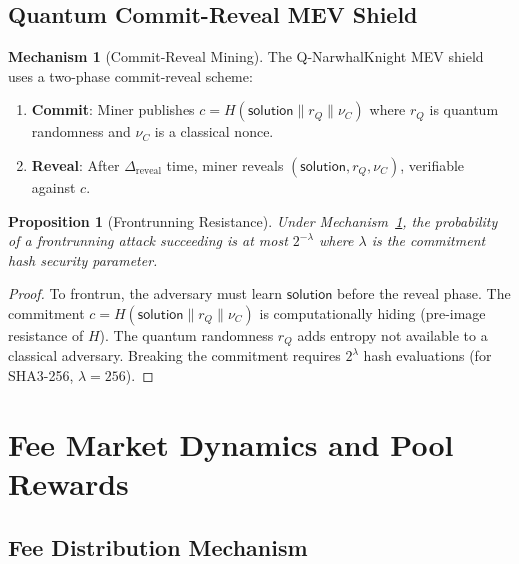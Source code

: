 \documentclass[11pt,a4paper]{article}
\newtheorem{proposition}[theorem]{Proposition}
\theoremstyle{definition}
\newtheorem{mechanism}[theorem]{Mechanism}
\theoremstyle{remark}
\newcommand{\QNK}{\textsf{Q-NarwhalKnight}}
\begin{document}
\subsection{Quantum Commit-Reveal MEV Shield}

\begin{mechanism}[Commit-Reveal Mining]\label{mech:commit-reveal}
The \QNK{} MEV shield uses a two-phase commit-reveal scheme:
\begin{enumerate}[nosep]
  \item \textbf{Commit}: Miner publishes
    $c = H(\mathsf{solution} \| r_Q \| \nu_C)$ where $r_Q$ is
    quantum randomness and $\nu_C$ is a classical nonce.
  \item \textbf{Reveal}: After $\Delta_{\text{reveal}}$ time, miner
    reveals $(\mathsf{solution}, r_Q, \nu_C)$, verifiable against $c$.
\end{enumerate}
\end{mechanism}

\begin{proposition}[Frontrunning Resistance]\label{prop:frontrun}
Under Mechanism~\ref{mech:commit-reveal}, the probability of a
frontrunning attack succeeding is at most $2^{-\lambda}$ where
$\lambda$ is the commitment hash security parameter.
\end{proposition}

\begin{proof}
To frontrun, the adversary must learn $\mathsf{solution}$ before the
reveal phase.
The commitment $c = H(\mathsf{solution} \| r_Q \| \nu_C)$ is
computationally hiding (pre-image resistance of $H$).
The quantum randomness $r_Q$ adds entropy not available to a classical
adversary.
Breaking the commitment requires $2^{\lambda}$ hash evaluations
(for SHA3-256, $\lambda = 256$).
\end{proof}

\section{Fee Market Dynamics and Pool Rewards}\label{sec:fees}

\subsection{Fee Distribution Mechanism}
\end{document}
